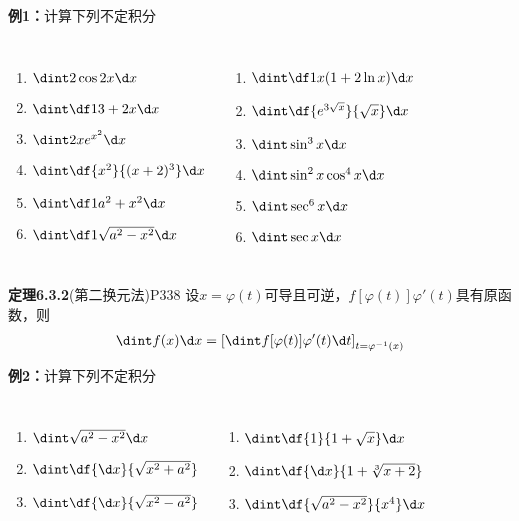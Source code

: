 \begin{frame}
	\linespread{1}
	\begin{exampleblock}{{\bf 例1：}计算下列不定积分\hfill}
		\begin{columns}\pause 
				\begin{enumerate}
				  \item $\dint 2\cos 2x\d x$\pause 
				  \item $\dint\df 1{3+2x}\d x$\pause 
				  \item $\dint 2xe^{x^2}\d x$\pause 
				  \item $\dint\df{x^2}{(x+2)^3}\d x$\pause 
				  \item $\dint\df 1{a^2+x^2}\d x$\pause 
				  \item $\dint\df 1{\sqrt{a^2-x^2}}\d x$\pause 
				\end{enumerate}
				\begin{enumerate}
				  \addtocounter{enumi}{6}
				  \item $\dint \df 1{x(1+2\ln x)}\d x$\pause 
				  \item $\dint\df {e^{3\sqrt x}}{\sqrt x}\d x$\pause 
				  \item $\dint \sin^3x\d x$\pause 
				  \item $\dint \sin^2x\cos^4x\d x$\pause 
				  \item $\dint\sec^6x\d x$\pause 
				  \item $\dint\sec x\d x$
				\end{enumerate}
		\end{columns}
	\end{exampleblock}
\end{frame}

\begin{frame}
	\linespread{1}
	\begin{block}{{\bf 定理6.3.2}(第二换元法)\hfill P338}
		设$x=\varphi(t)$可导且可逆，$f[\varphi(t)]\varphi'(t)$具有原函数，则
		$$\dint f(x)\d x=\left[\dint
		f[\varphi(t)]\varphi'(t)\d t\right]_{t=\varphi^{-1}(x)}$$
	\end{block}\pause 
	\begin{exampleblock}{{\bf 例2：}计算下列不定积分\hfill}
		\begin{columns}
				\begin{enumerate}\pause 
				  \item $\dint \sqrt{a^2-x^2}\d x$\pause 
				  \item $\dint\df{\d x}{\sqrt{x^2+a^2}}$\pause 
				  \item $\dint\df{\d x}{\sqrt{x^2-a^2}}$\pause 
				\end{enumerate}
				\begin{enumerate}
				  \item $\dint \df{1}{1+\sqrt x}\d x$\pause 
				  \item $\dint\df{\d x}{1+\sqrt[3]{x+2}}$\pause 
				  \item $\dint\df{\sqrt{a^2-x^2}}{x^4}\d x$
				\end{enumerate}
		\end{columns}
	\end{exampleblock}
\end{frame}

